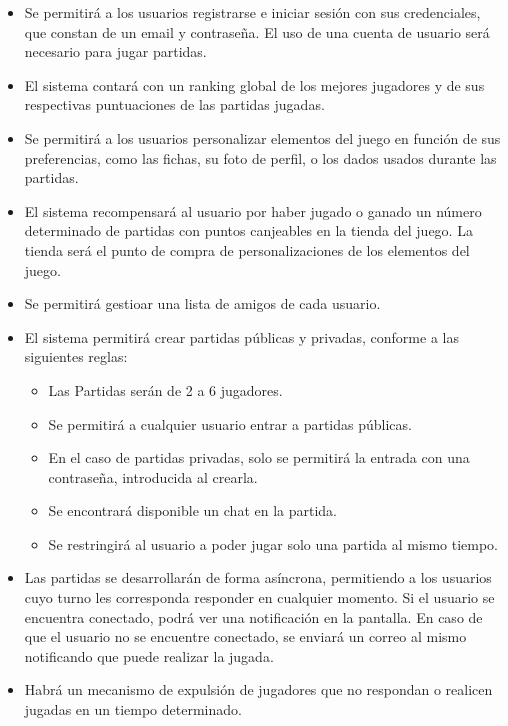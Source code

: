 \documentclass[12pt, a4paper, titlepage]{article}
\begin{document}
\begin{itemize}
\item Se permitirá a los usuarios registrarse e iniciar sesión con sus credenciales, que constan de un email y contraseña. El uso de una cuenta de usuario será necesario para jugar partidas.

\item El sistema contará con un ranking global de los mejores jugadores y de sus respectivas puntuaciones de las partidas jugadas.

\item Se permitirá a los usuarios personalizar elementos del juego en función de sus preferencias, como las fichas, su foto de perfil, o los dados usados durante las partidas.

\item El sistema recompensará al usuario por haber jugado o ganado un número determinado de partidas con puntos canjeables en la tienda del juego. La tienda será el punto de compra de personalizaciones de los elementos del juego.

\item Se permitirá gestioar una lista de amigos de cada usuario.

\item El sistema permitirá crear partidas públicas y privadas, conforme a las siguientes reglas:
\begin{itemize}
    \item Las Partidas serán de 2 a 6 jugadores.
    \item Se permitirá a cualquier usuario entrar a partidas públicas.
    \item En el caso de partidas privadas, solo se permitirá la entrada con una contraseña, introducida al crearla.
    \item Se encontrará disponible un chat en la partida.
    \item Se restringirá al usuario a poder jugar solo una partida al mismo tiempo.
\end{itemize}

\item Las partidas se desarrollarán de forma asíncrona, permitiendo a los usuarios cuyo turno les corresponda responder en cualquier momento. Si el usuario se encuentra conectado, podrá ver una notificación en la pantalla. En caso de que el usuario no se encuentre conectado, se enviará un correo al mismo notificando que puede realizar la jugada.

\item Habrá un mecanismo de expulsión de jugadores que no respondan o realicen jugadas en un tiempo determinado.

\end{itemize}
\end{document}
